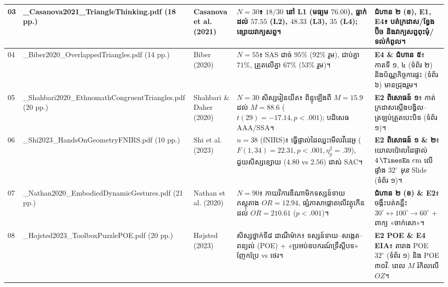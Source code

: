 \documentclass[a4paper,12pt]{article}
\newcommand{\en}[1]{{\TimesEn #1}}
\newcommand{\unit}[1]{\,\text{\en{#1}}}
\begin{document}
\begin{longtable}{|C{0.70cm}|L{3.60cm}|L{2.55cm}|L{5.75cm}|L{4.00cm}|}
03 & \en{03\_\allowbreak Casanova2021\_\allowbreak Triangle\allowbreak Thinking.pdf} \en{(18 pp.)} & \en{Casanova et al. (2021)} &
$N=30$៖ $18/30$ នៅ \en{L1} (មធ្យម $76.00$), ធ្លាក់ដល់ $57.55$ (\en{L2}), $48.33$ (\en{L3}), $35$ (\en{L4}); ខ្សោយវាក្យសព្ទ។ &
\textbf{ជំហាន ២ (ខ), E1, E4}៖ បត់ក្រដាស/ខ្វែងប៊ិច និងវាក្យសព្ទពុះមុំ/ទល់កំពូល។ \\ \hline

04 & \en{04\_\allowbreak Biber2020\_\allowbreak Overlapped\allowbreak Triangles.pdf} \en{(14 pp.)} & \en{Biber (2020)} &
$N=55$៖ \en{SAS} ដាច់ $95\%$ ($92\%$ រួម), ជាប់គ្នា $71\%$, ត្រួតលើគ្នា $67\%$ ($53\%$ រួម)។ &
\textbf{E4 \& ជំហាន ៥}៖ កាតទី ១, ៤ (ទំព័រ ២) និងប័ណ្ណកិច្ចការផ្ទះ (ទំព័រ ៦) មានជ្រុងរួម។ \\ \hline

05 & \en{05\_\allowbreak Shahbari2020\_\allowbreak Ethnomath\allowbreak Congruent\allowbreak Triangles.pdf} \en{(20 pp.)} & \en{Shahbari \& Daher (2020)} &
$N=30$ សិស្សរៀនយឺត៖ ពិន្ទុឡើងពី $M=15.9$ ដល់ $M=88.6$ ($t(29)=-17.14, p<.001$); បដិសេធ \en{AAA/SSA}។ &
\textbf{E2 ពិសោធន៍ ១}៖ កាត់ក្រដាសស្តើងបង្វិល--ត្រឡប់ត្រួតបេះបិទ (ទំព័រ ១)។ \\ \hline

06 & \en{06\_\allowbreak Shi2023\_\allowbreak HandsOn\allowbreak Geometry\allowbreak FNIRS.pdf} \en{(10 pp.)} & \en{Shi et al. (2023)} &
$n=38$ (\en{fNIRS})៖ ធ្វើផ្ទាល់ដៃឈ្នះមើលវីដេអូ ($F(1,34)=22.31, p<.001, \eta^2_p=.39$), ជួយសិស្សខ្សោយ ($4.80$ \en{vs} $2.56$) ដាស់ \en{SAC}។ &
\textbf{E2 ពិសោធន៍ ១ \& ២}៖ យោលប៉ោលដៃផ្ទាល់ $4\unit{cm}$ លើផ្ទាំង $32^\circ$ \textit{មុន} \en{Slide} (ទំព័រ ១)។ \\ \hline

07 & \en{07\_\allowbreak Nathan2020\_\allowbreak Embodied\allowbreak Dynamic\allowbreak Gestures.pdf} \en{(21 pp.)} & \en{Nathan et al. (2020)} &
$N=90$៖ កាយវិការឌីណាមិកទស្សន៍ទាយភស្តុតាង $OR=12.94$, ផ្សំភាសាផ្ដោតលើវត្ថុកើនដល់ $OR=210.61$ ($p<.001$)។ &
\textbf{ជំហាន ២ (ខ) \& E2}៖ ចង្កឹះបត់គន្លឹះ $30^\circ \leftrightarrow 100^\circ \to 60^\circ$ + ពាក្យ «ចាក់សោ»។ \\ \hline

08 & \en{08\_\allowbreak Hojsted2023\_\allowbreak Toolbox\allowbreak PuzzlePOE.pdf} \en{(20 pp.)} & \en{H\o jsted (2023)} &
សិស្សថ្នាក់ទី៨ ដាណឺម៉ាក៖ ទស្សន៍ទាយ--សង្កេត--ពន្យល់ (\en{POE}) + «ប្រអប់ឧបករណ៍ទ្រឹស្ដីបទ» ញែកប្រែ \en{vs} ថេរ។ &
\textbf{E2 POE \& E4 EIA}៖ តារាង \en{POE} $32^\circ$ (ទំព័រ ១) និង \en{POE} ៣០វិ. ពេល $M$ រំកិលលើ $OZ$។ \\ \hline


\end{longtable}
\end{document}
